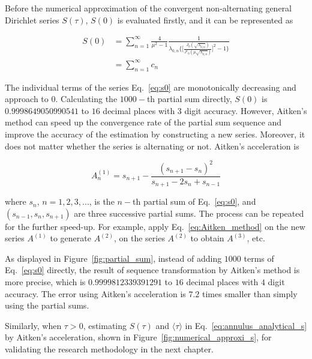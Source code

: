 \newpage

Before the numerical approximation of the convergent non-alternating
general Dirichlet series \cite{hardy2013general} $S(\tau)$, $S(0)$ is
evaluated firstly, and it can be represented as

\begin{equation}\label{eq:s0}
\begin{split}
S(0) &= \sum_{n=1}^{\infty} \frac{4}{\mu^2 - 1} \frac{1}{\lambda_{0,n} \bigg\{\bigg[\frac{J_0(\sqrt{\lambda_{0,n}})}{J'_0(\mu\sqrt{\lambda_{0,n}})}\bigg]^2 -1\bigg\}}\\
&= \sum_{n=1}^{\infty} c_n
\end{split}
\end{equation}

The individual terms of the series Eq.~\ref{eq:s0} are monotonically
decreasing and approach to $0$. Calculating the $1000-$th partial sum
directly, $S(0)$ is $0.9998649050990541$ to $16$ decimal places with
$3$ digit accuracy. However, Aitken’s method can speed up the
convergence rate of the partial sum sequence and improve the accuracy
of the estimation by constructing a new series. Moreover, it does not
matter whether the series is alternating or not. Aitken's acceleration
is

\begin{equation}\label{eq:Aitken_method}
A^{(1)}_n = s_{n+1} - \frac{(s_{n+1} - s_n)^2}{s_{n+1} - 2s_n + s_{n-1}}
\end{equation}

where  $s_n$,  $n=1,  2,  3,  ...$,  is  the  $n-$th  partial  sum  of
Eq.~\ref{eq:s0}, and  $(s_{n-1}, s_n,  s_{n+1})$ are  three successive
partial  sums.   The  process   can  be   repeated  for   the  further
speed-up.  For example,  apply Eq.~\ref{eq:Aitken_method}  on the  new
series $A^{(1)}$  to generate  $A^{(2)}$, on  the series  $A^{(2)}$ to
obtain $A^{(3)}$, etc.

As displayed in Figure~\ref{fig:partial_sum}, instead of adding $1000$
terms of Eq.~\ref{eq:s0} directly, the result of sequence
transformation by Aitken's method is more precise, which is
$0.9999812339391291$ to $16$ decimal places with $4$ digit
accuracy. The error using Aitken's acceleration is $7.2$ times smaller
than simply using the partial sums.


Similarly, when $\tau > 0$, estimating $S(\tau)$ and $\langle \tau \rangle$ in
Eq.~\ref{eq:annulus_analytical_s} by Aitken's acceleration, shown in
Figure~\ref{fig:numerical_approxi_s}, for validating the research
methodology in the next chapter.



